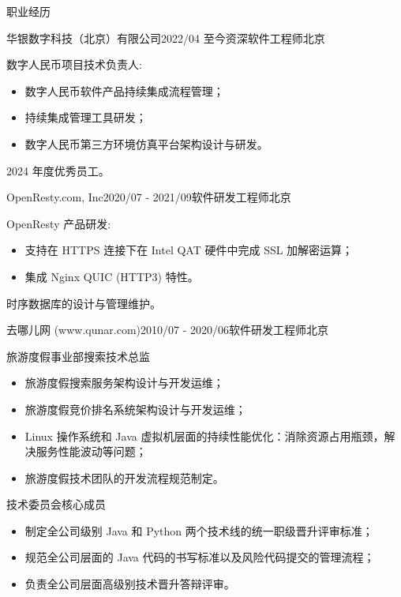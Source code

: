 \documentclass{resume} %
\begin{document}
\begin{rSection}{职业经历}

  \begin{rSubsection}{华银数字科技（北京）有限公司}{2022/04 至今}{资深软件工程师}{北京}
  \item 数字人民币项目技术负责人:
    \begin {itemize}
    \item 数字人民币软件产品持续集成流程管理；
    \item 持续集成管理工具研发；
    \item 数字人民币第三方环境仿真平台架构设计与研发。
    \end{itemize}
  \item 2024 年度优秀员工。
  \end{rSubsection}

  \begin{rSubsection}{OpenResty.com, Inc}{2020/07 - 2021/09}{软件研发工程师}{北京}
  \item OpenResty 产品研发:
    \begin {itemize}
    \item 支持在 HTTPS 连接下在 Intel QAT 硬件中完成 SSL 加解密运算；
    \item 集成 Nginx QUIC (HTTP3) 特性。
    \end{itemize}
  \item 时序数据库的设计与管理维护。
  \end{rSubsection}

  \begin{rSubsection}{去哪儿网 (www.qunar.com)}{2010/07 - 2020/06}{软件研发工程师}{北京}

  \item 旅游度假事业部搜索技术总监
    \begin{itemize}
    \item 旅游度假搜索服务架构设计与开发运维；
    \item 旅游度假竞价排名系统架构设计与开发运维；
    \item Linux 操作系统和 Java 虚拟机层面的持续性能优化：消除资源占用瓶颈，解决服务性能波动等问题；
    \item 旅游度假技术团队的开发流程规范制定。
    \end{itemize}
  \item 技术委员会核心成员
    \begin{itemize}
    \item 制定全公司级别 Java 和 Python 两个技术线的统一职级晋升评审标准；
    \item 规范全公司层面的 Java 代码的书写标准以及风险代码提交的管理流程；
    \item 负责全公司层面高级别技术晋升答辩评审。
    \end{itemize}
    

\end{rSubsection}
\end{rSection}
\end{document}
